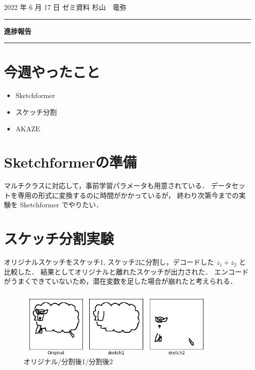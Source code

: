 \documentclass[onecolumn]{ujarticle}   %
\begin{document}

		\noindent
		\hspace{1em}
		2022 年 6 月 17 日
		ゼミ資料
		\hfill
		杉山　竜弥
		\vspace{2mm}

		\hrule
		\begin{center}
			{\Large \bf 進捗報告}
		\end{center}
		\hrule
		\vspace{9mm}


\section{今週やったこと}
\begin{itemize}
  \item Sketchformer
  \item スケッチ分割
  \item AKAZE
\end{itemize}


\section{Sketchformerの準備}
マルチクラスに対応して，事前学習パラメータも用意されている．
データセットを専用の形式に変換するのに時間がかかっているが，
終わり次第今までの実験を Sketchformer でやりたい．


\section{スケッチ分割実験}

オリジナルスケッチをスケッチ1, スケッチ2に分割し，デコードした $z_1 + z_2$ と比較した．
結果としてオリジナルと離れたスケッチが出力された．
エンコードがうまくできていないため，潜在変数を足した場合が崩れたと考えられる．


\begin{figure}[th]
  \begin{center}
    \includegraphics[clip,width=100mm]{sketch_trained_split_6.png}
    \caption{オリジナル/分割後1/分割後2}
    \label{fig:result1_1}
  \end{center}
\end{figure}
\end{document}
